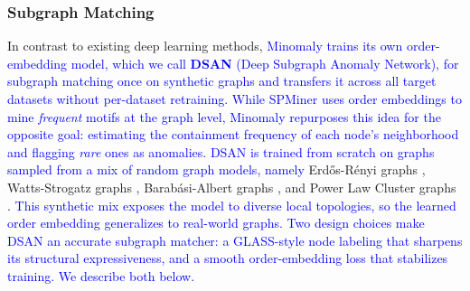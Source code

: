 \documentclass[preprint,12pt]{elsarticle}
\newcommand{\new}[1]{\textcolor{blue}{#1}}
\theoremstyle{plain}
\theoremstyle{definition}
\theoremstyle{remark}
\begin{document}
\subsubsection{Subgraph Matching}
In contrast to existing deep learning methods, \new{Minomaly trains its own order-embedding model, which we call \textbf{DSAN} (Deep Subgraph Anomaly Network), for subgraph matching once on synthetic graphs and transfers it across all target datasets without per-dataset retraining. While SPMiner \cite{ying2024representation} uses order embeddings to mine \emph{frequent} motifs at the graph level, Minomaly repurposes this idea for the opposite goal: estimating the containment frequency of each node's neighborhood and flagging \emph{rare} ones as anomalies. DSAN is trained from scratch on graphs sampled from a mix of random graph models, namely} Erdős-Rényi graphs \cite{erd6s1959random}, Watts-Strogatz graphs \cite{watts1998collective}, Barabási-Albert graphs \cite{barabasi1999emergence}, and Power Law Cluster graphs \cite{holme2002growing}. \new{This synthetic mix exposes the model to diverse local topologies, so the learned order embedding generalizes to real-world graphs. Two design choices make DSAN an accurate subgraph matcher: a GLASS-style node labeling that sharpens its structural expressiveness, and a smooth order-embedding loss that stabilizes training. We describe both below.}
\end{document}
